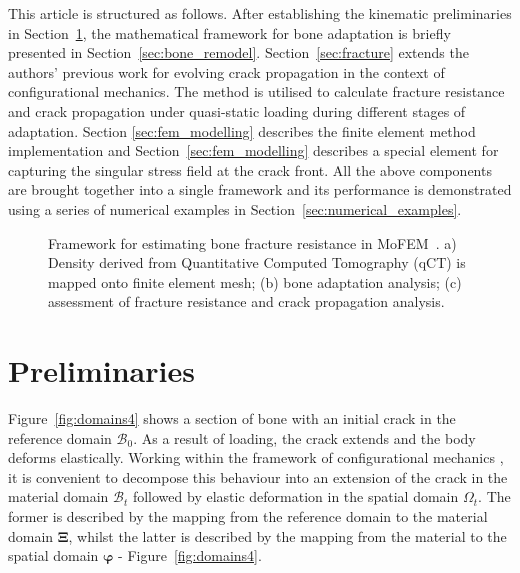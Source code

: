 \documentclass[twocolumn]{svjour3}
\begin{document}
This article is structured as follows. After establishing the kinematic preliminaries in Section~\ref{preliminaries}, the mathematical framework for bone adaptation is briefly presented in Section~\ref{sec:bone_remodel}. Section~\ref{sec:fracture} extends the authors' previous work for evolving crack propagation in the context of configurational mechanics. The method is utilised to calculate fracture resistance and crack propagation under quasi-static loading during different stages of adaptation. Section \ref{sec:fem_modelling} describes the finite element method implementation and Section~\ref{sec:fem_modelling} describes a special element for capturing the singular stress field at the crack front.  
All the above components are brought together into a single framework and its performance is demonstrated using a series of numerical examples in Section~\ref{sec:numerical_examples}.

\begin{figure}[h]
\caption{Framework for estimating bone fracture resistance in MoFEM~\cite{mofemJoss2020}. a) Density derived from Quantitative Computed Tomography (qCT) is mapped onto finite element mesh; (b) bone adaptation analysis; (c) assessment of fracture resistance and crack propagation analysis.}
\label{fig:framework}
\end{figure}

 
\section{Preliminaries}
\label{preliminaries}
Figure~\ref{fig:domains4} shows a section of bone with an initial crack in the reference domain $\mathscr{B}_{0}$. As a result of loading, the crack extends and the body deforms elastically. Working within the framework of configurational mechanics \cite{kaczmarczyk2014three,kienzler2014configurational}, it is convenient to decompose this behaviour into an extension of the crack in the material domain  $\mathscr{B}_t$ followed by elastic deformation  in the spatial domain $\Omega_t$. The former is described by the mapping from the reference  domain to the material domain ${\boldsymbol\Xi}$, whilst the latter is described by the mapping from the material to the spatial domain ${\boldsymbol\varphi}$ - Figure~\ref{fig:domains4}.
\end{document}
